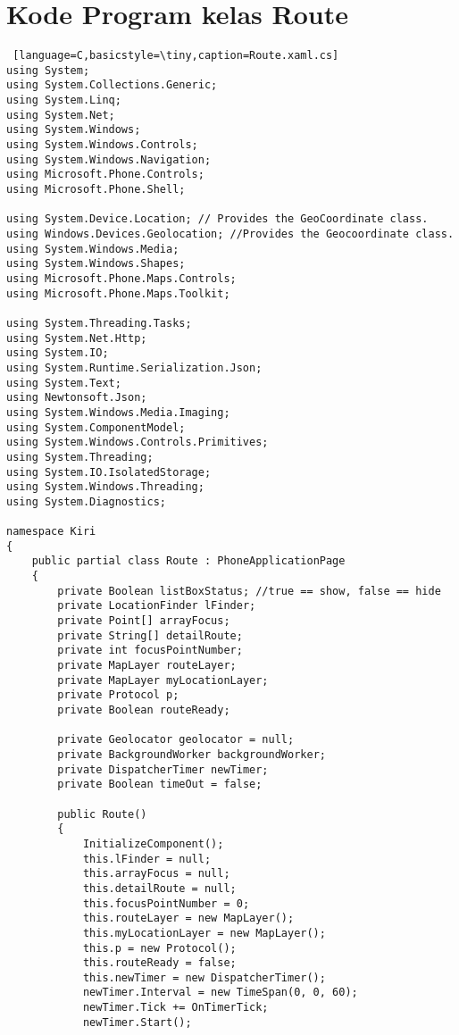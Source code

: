 \chapter{Kode Program kelas Route}
\label{app:C}

\singlespacing 
%
%

\begin{lstlisting} [language=C,basicstyle=\tiny,caption=Route.xaml.cs]
using System;
using System.Collections.Generic;
using System.Linq;
using System.Net;
using System.Windows;
using System.Windows.Controls;
using System.Windows.Navigation;
using Microsoft.Phone.Controls;
using Microsoft.Phone.Shell;

using System.Device.Location; // Provides the GeoCoordinate class.
using Windows.Devices.Geolocation; //Provides the Geocoordinate class.
using System.Windows.Media;
using System.Windows.Shapes;
using Microsoft.Phone.Maps.Controls;
using Microsoft.Phone.Maps.Toolkit;

using System.Threading.Tasks;
using System.Net.Http;
using System.IO;
using System.Runtime.Serialization.Json;
using System.Text;
using Newtonsoft.Json;
using System.Windows.Media.Imaging;
using System.ComponentModel;
using System.Windows.Controls.Primitives;
using System.Threading;
using System.IO.IsolatedStorage;
using System.Windows.Threading;
using System.Diagnostics;

namespace Kiri
{
    public partial class Route : PhoneApplicationPage
    {
        private Boolean listBoxStatus; //true == show, false == hide
        private LocationFinder lFinder;
        private Point[] arrayFocus;
        private String[] detailRoute;
        private int focusPointNumber;
        private MapLayer routeLayer;
        private MapLayer myLocationLayer;
        private Protocol p;
        private Boolean routeReady;

        private Geolocator geolocator = null;
        private BackgroundWorker backgroundWorker;
        private DispatcherTimer newTimer;
        private Boolean timeOut = false;

        public Route()
        {
            InitializeComponent();
            this.lFinder = null;
            this.arrayFocus = null;
            this.detailRoute = null;
            this.focusPointNumber = 0;
            this.routeLayer = new MapLayer();
            this.myLocationLayer = new MapLayer();
            this.p = new Protocol();
            this.routeReady = false;
            this.newTimer = new DispatcherTimer();
            newTimer.Interval = new TimeSpan(0, 0, 60);
            newTimer.Tick += OnTimerTick;
            newTimer.Start();


\end{lstlisting}
